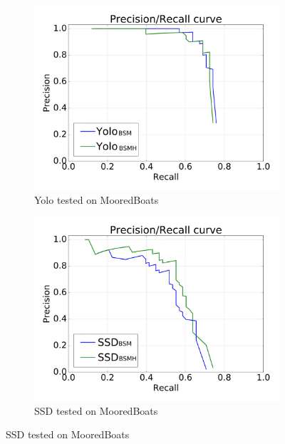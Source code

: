 \begin{figure}[h!]
\captionsetup[subfigure]{justification=centering}
\begin{subfigure}{.5\textwidth}
  \centering
  \includegraphics[width=0.8\linewidth]{results/case_buildings/prec_recall/yolo/bb-eps.png}
  \caption{Yolo tested on MooredBoats}
  \label{fig:sfig1}
\end{subfigure}%
\begin{subfigure}{.5\textwidth}
  \centering
  \includegraphics[width=.8\linewidth]{results/case_buildings/prec_recall/ssd/bb-eps.png}
  \caption{SSD tested on MooredBoats}
  \label{fig:sfig2}
\end{subfigure}


\end{figure}
